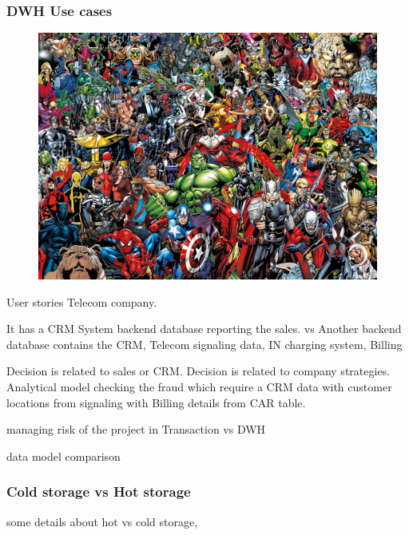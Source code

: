\begin{frame}
\frametitle{DWH Use cases}
\begin{figure}[ht]
	
	\centering
	\includegraphics[width=\linewidth,height=.8\textheight]{./Figures/chapter-01/Marvel-01.jpg}
\end{figure}
\end{frame}

User stories Telecom company.

It has a CRM System backend database reporting the sales. vs Another backend database contains the CRM, Telecom signaling data, IN charging system, Billing

Decision is related to sales or CRM. Decision is related to company strategies.
Analytical model checking the fraud which require a CRM data with customer locations from signaling with Billing details from CAR table.


managing risk of the project in Transaction vs DWH




data model comparison




\begin{frame}

\frametitle{Cold storage vs Hot storage}

some details about hot vs cold storage,

\end{frame}



